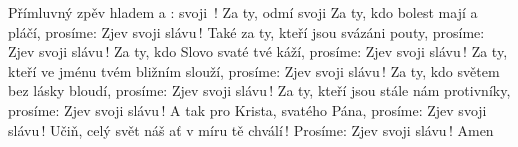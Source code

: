 \begin{TEXT}{Přímluvný zpěv}
\SLOKA {}  hladem  a \NL
{}:  svoji \,! \NL
Za ty,     odmí \NL                                                %
  svoji  
\SLOKA Za ty, kdo bolest mají a pláčí,\NL
prosíme: Zjev svoji slávu\,!\NL
Také za ty, kteří jsou svázáni pouty,\NL
prosíme: Zjev svoji slávu\,!
\SLOKA Za ty, kdo Slovo svaté tvé káží,\NL
prosíme: Zjev svoji slávu\,!\NL
Za ty, kteří ve jménu tvém bližním slouží,\NL
prosíme: Zjev svoji slávu\,!
\SLOKA Za ty, kdo světem bez lásky bloudí,\NL
prosíme: Zjev svoji slávu\,!\NL
Za ty, kteří jsou stále nám protivníky,\NL
prosíme: Zjev svoji slávu\,!
\SLOKA A tak pro Krista, svatého Pána,\NL
prosíme: Zjev svoji slávu\,!\NL
Učiň, celý svět náš ať v míru tě chválí\,!\NL
Prosíme: Zjev svoji slávu\,! Amen\NL
\end{TEXT}
